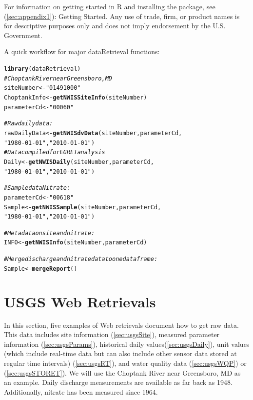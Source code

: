 \documentclass[a4paper,11pt]{article}\usepackage[]{graphicx}\usepackage[]{color}
\makeatletter
\newcommand{\hlstr}[1]{\textcolor[rgb]{0.192,0.494,0.8}{#1}}%
\newcommand{\hlcom}[1]{\textcolor[rgb]{0.678,0.584,0.686}{\textit{#1}}}%
\newcommand{\hlstd}[1]{\textcolor[rgb]{0.345,0.345,0.345}{#1}}%
\newcommand{\hlkwb}[1]{\textcolor[rgb]{0.69,0.353,0.396}{#1}}%
\newcommand{\hlkwd}[1]{\textcolor[rgb]{0.737,0.353,0.396}{\textbf{#1}}}%
\newenvironment{kframe}{%
 \def\at@end@of@kframe{}%
 \ifinner\ifhmode%
  \def\at@end@of@kframe{\end{minipage}}%
  \begin{minipage}{\columnwidth}%
 \fi\fi%
 \def\FrameCommand##1{\hskip\@totalleftmargin \hskip-\fboxsep
 \colorbox{shadecolor}{##1}\hskip-\fboxsep
     \hskip-\linewidth \hskip-\@totalleftmargin \hskip\columnwidth}%
 \MakeFramed {\advance\hsize-\width
   \@totalleftmargin\z@ \linewidth\hsize
   \@setminipage}}%
 {\par\unskip\endMakeFramed%
 \at@end@of@kframe}
\newenvironment{knitrout}{}{} %
\makeatother
\begin{document}
For information on getting started in R and installing the package, see (\ref{sec:appendix1}): Getting Started. Any use of trade, firm, or product names is for descriptive purposes only and does not imply endorsement by the U.S. Government.

A quick workflow for major dataRetrieval functions:

\begin{knitrout}
\color{fgcolor}\begin{kframe}
\begin{alltt}
\hlkwd{library}\hlstd{(dataRetrieval)}
\hlcom{# Choptank River near Greensboro, MD}
\hlstd{siteNumber} \hlkwb{<-} \hlstr{"01491000"}
\hlstd{ChoptankInfo} \hlkwb{<-} \hlkwd{getNWISSiteInfo}\hlstd{(siteNumber)}
\hlstd{parameterCd} \hlkwb{<-} \hlstr{"00060"}

\hlcom{#Raw daily data:}
\hlstd{rawDailyData} \hlkwb{<-} \hlkwd{getNWISdvData}\hlstd{(siteNumber,parameterCd,}
                      \hlstr{"1980-01-01"}\hlstd{,}\hlstr{"2010-01-01"}\hlstd{)}
\hlcom{# Data compiled for EGRET analysis}
\hlstd{Daily} \hlkwb{<-} \hlkwd{getNWISDaily}\hlstd{(siteNumber,parameterCd,}
                      \hlstr{"1980-01-01"}\hlstd{,}\hlstr{"2010-01-01"}\hlstd{)}

\hlcom{# Sample data Nitrate:}
\hlstd{parameterCd} \hlkwb{<-} \hlstr{"00618"}
\hlstd{Sample} \hlkwb{<-} \hlkwd{getNWISSample}\hlstd{(siteNumber,parameterCd,}
                      \hlstr{"1980-01-01"}\hlstd{,}\hlstr{"2010-01-01"}\hlstd{)}

\hlcom{# Metadata on site and nitrate:}
\hlstd{INFO} \hlkwb{<-} \hlkwd{getNWISInfo}\hlstd{(siteNumber,parameterCd)}

\hlcom{# Merge discharge and nitrate data to one dataframe:}
\hlstd{Sample} \hlkwb{<-} \hlkwd{mergeReport}\hlstd{()}
\end{alltt}
\end{kframe}
\end{knitrout}


\section{USGS Web Retrievals}
\label{sec:genRetrievals}
In this section, five examples of Web retrievals document how to get raw data. This data includes site information (\ref{sec:usgsSite}), measured parameter information (\ref{sec:usgsParams}), historical daily values(\ref{sec:usgsDaily}), unit values (which include real-time data but can also include other sensor data stored at regular time intervals) (\ref{sec:usgsRT}), and water quality data (\ref{sec:usgsWQP}) or (\ref{sec:usgsSTORET}). We will use the Choptank River near Greensboro, MD as an example.  Daily discharge measurements are available as far back as 1948.  Additionally, nitrate has been measured since 1964. 
\end{document}
